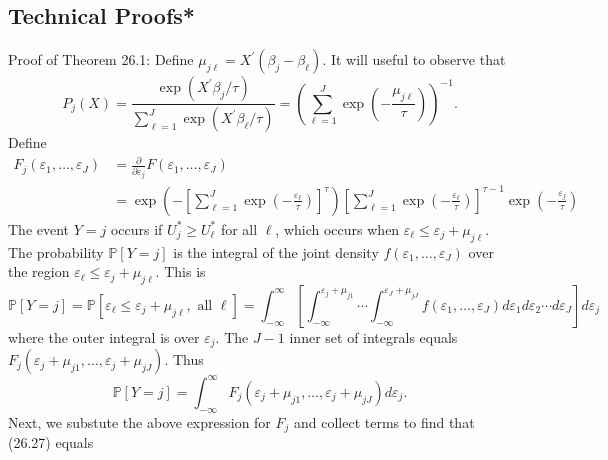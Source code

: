 \documentclass[10pt]{article}
\begin{document}
\subsection{Technical Proofs*}
Proof of Theorem 26.1: Define $\mu_{j \ell}=X^{\prime}\left(\beta_{j}-\beta_{\ell}\right)$. It will useful to observe that
$$
P_{j}(X)=\frac{\exp \left(X^{\prime} \beta_{j} / \tau\right)}{\sum_{\ell=1}^{J} \exp \left(X^{\prime} \beta_{\ell} / \tau\right)}=\left(\sum_{\ell=1}^{J} \exp \left(-\frac{\mu_{j \ell}}{\tau}\right)\right)^{-1} .
$$
Define
$$
\begin{aligned}
F_{j}\left(\varepsilon_{1}, \ldots, \varepsilon_{J}\right) &=\frac{\partial}{\partial \varepsilon_{j}} F\left(\varepsilon_{1}, \ldots, \varepsilon_{J}\right) \\
&=\exp \left(-\left[\sum_{\ell=1}^{J} \exp \left(-\frac{\varepsilon_{\ell}}{\tau}\right)\right]^{\tau}\right)\left[\sum_{\ell=1}^{J} \exp \left(-\frac{\varepsilon_{\ell}}{\tau}\right)\right]^{\tau-1} \exp \left(-\frac{\varepsilon_{j}}{\tau}\right)
\end{aligned}
$$
The event $Y=j$ occurs if $U_{j}^{*} \geq U_{\ell}^{*}$ for all $\ell$, which occurs when $\varepsilon_{\ell} \leq \varepsilon_{j}+\mu_{j \ell}$. The probability $\mathbb{P}[Y=j]$ is the integral of the joint density $f\left(\varepsilon_{1}, \ldots, \varepsilon_{J}\right)$ over the region $\varepsilon_{\ell} \leq \varepsilon_{j}+\mu_{j \ell}$. This is
$$
\mathbb{P}[Y=j]=\mathbb{P}\left[\varepsilon_{\ell} \leq \varepsilon_{j}+\mu_{j \ell}, \text { all } \ell\right]=\int_{-\infty}^{\infty}\left[\int_{-\infty}^{\varepsilon_{j}+\mu_{j 1}} \cdots \int_{-\infty}^{\varepsilon_{J}+\mu_{j J}} f\left(\varepsilon_{1}, \ldots, \varepsilon_{J}\right) d \varepsilon_{1} d \varepsilon_{2} \cdots d \varepsilon_{J}\right] d \varepsilon_{j}
$$
where the outer integral is over $\varepsilon_{j}$. The $J-1$ inner set of integrals equals $F_{j}\left(\varepsilon_{j}+\mu_{j 1}, \ldots, \varepsilon_{j}+\mu_{j J}\right)$. Thus
$$
\mathbb{P}[Y=j]=\int_{-\infty}^{\infty} F_{j}\left(\varepsilon_{j}+\mu_{j 1}, \ldots, \varepsilon_{j}+\mu_{j J}\right) d \varepsilon_{j} .
$$
Next, we substute the above expression for $F_{j}$ and collect terms to find that (26.27) equals
\end{document}
